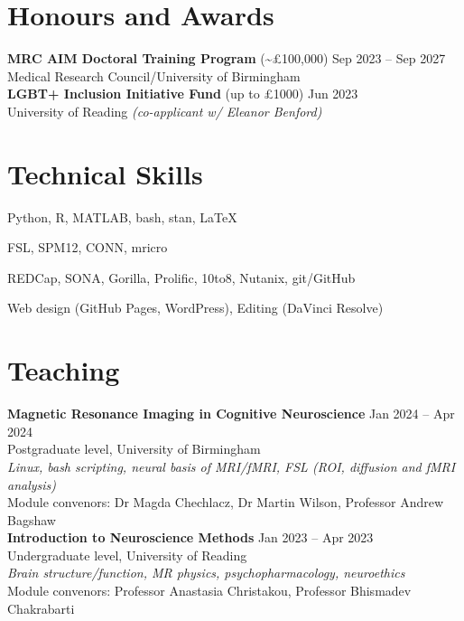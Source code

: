 \documentclass[a4paper,10pt]{article}
\begin{document}
\section{Honours and Awards}
\vspace{2pt}
\textbf{MRC AIM Doctoral Training Program} (\textasciitilde £100,000) \hfill Sep 2023 -- Sep 2027 \\
Medical Research Council/University of Birmingham \\
\vspace{8pt} 
\textbf{LGBT+ Inclusion Initiative Fund} (up to £1000) \hfill Jun 2023\\
University of Reading \textit{(co-applicant w/ Eleanor Benford)}

\section{Technical Skills}
\vspace{2pt}
\begin{description}[left=0pt, font=\normalfont\bfseries]
  \item[Programming Languages:] Python, R, MATLAB, bash, stan, \LaTeX{}
  \item[Neuroimaging Software:] FSL, SPM12, CONN, mricro
  \item[Online Research Services:] REDCap, SONA, Gorilla, Prolific, 10to8, Nutanix, git/GitHub
  \item[Other:] Web design (GitHub Pages, WordPress), Editing (DaVinci Resolve)
\end{description}

\section{Teaching}
\vspace{2pt}
\textbf{Magnetic Resonance Imaging in Cognitive Neuroscience}  \hfill Jan 2024 -- Apr 2024 \\
Postgraduate level, University of Birmingham \\
\textit{Linux, bash scripting, neural basis of MRI/fMRI, FSL (ROI, diffusion and fMRI analysis) } \\
Module convenors: Dr Magda Chechlacz, Dr Martin Wilson, Professor Andrew Bagshaw \\
\vspace{8pt}
\textbf{Introduction to Neuroscience Methods} \hfill Jan 2023 -- Apr 2023 \\
Undergraduate level, University of Reading \\
\textit{Brain structure/function, MR physics, psychopharmacology, neuroethics} \\
Module convenors: Professor Anastasia Christakou, Professor Bhismadev Chakrabarti  \\
\vspace{4pt} 
\end{document}
